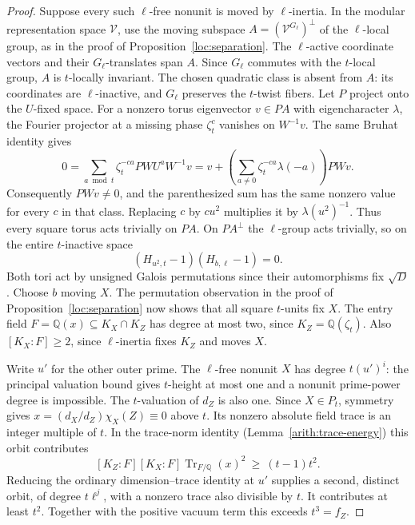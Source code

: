 \documentclass[11pt,a4paper]{article}
\numberwithin{equation}{section}
\newcommand{\QQ}{\mathbb Q}
\begin{document}
\begin{proof}
Suppose every such $\ell$-free nonunit is moved by $\ell$-inertia.
In the modular representation space $\mathcal V$, use the moving subspace
$A=(\mathcal V^{G_\ell})^\perp$ of the $\ell$-local group, as in the
proof of Proposition~\ref{loc:separation}. The $\ell$-active
coordinate vectors and their $G_\ell$-translates span $A$.
Since $G_\ell$ commutes with the $t$-local group, $A$ is
$t$-locally invariant. The chosen quadratic class is absent
from $A$: its coordinates are $\ell$-inactive, and $G_\ell$
preserves the $t$-twist fibers.
Let $P$ project onto the $U$-fixed
space. For a nonzero torus eigenvector $v\in PA$ with
eigencharacter $\lambda$, the Fourier projector at a missing
phase $\zeta_t^c$ vanishes on $W^{-1}v$. The same Bruhat identity
gives
\[
 0=\sum_{a\bmod t}\zeta_t^{-ca}P WU^aW^{-1}v
   =v+\left(\sum_{a\ne0}\zeta_t^{-ca}\lambda(-a)\right)PWv .
\]
Consequently $PWv\ne0$, and the parenthesized sum has the same
nonzero value for every $c$ in that class. Replacing $c$ by
$cu^2$ multiplies it by $\lambda(u^2)^{-1}$. Thus every square
torus acts trivially on $PA$. On $P A^\perp$ the $\ell$-group acts
trivially, so on the entire $t$-inactive space
\[
                (H_{u^2,t}-1)(H_{b,\ell}-1)=0 .
\]
Both tori act by unsigned Galois permutations since their
automorphisms fix $\sqrt D$. Choose $b$ moving $X$. The permutation observation in the
proof of Proposition~\ref{loc:separation} now shows that all
square $t$-units fix $X$.
The entry field $F=\QQ(x)\subseteq K_X\cap K_Z$ has degree at
most two, since $K_Z=\QQ(\zeta_t)$. Also $[K_X:F]\ge2$, since
$\ell$-inertia fixes $K_Z$ and moves $X$.

Write $u'$ for the other outer prime. The $\ell$-free nonunit $X$
has degree $t(u')^i$: the principal valuation bound gives
$t$-height at most one and a nonunit prime-power degree is
impossible. The $t$-valuation of $d_Z$ is also one.
Since $X\in P_t$, symmetry gives
$x=(d_X/d_Z)\chi_X(Z)\equiv0$ above $t$. Its nonzero absolute
field trace is an integer multiple of $t$. In the trace-norm
identity (Lemma~\ref{arith:trace-energy}) this orbit contributes
\[
 [K_Z:F][K_X:F]\operatorname{Tr}_{F/\QQ}(x)^2
                         \ \ge\ (t-1)t^2 .
\]
Reducing the ordinary dimension--trace identity at $u'$ supplies
a second, distinct orbit, of degree $t\ell^j$, with a nonzero trace
also divisible by $t$. It contributes at least $t^2$.
Together with the positive vacuum term this exceeds $t^3=f_Z$.
\end{proof}
\end{document}
